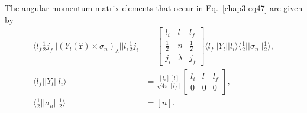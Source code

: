 The angular momentum matrix elements that occur in Eq.\ \eqref{chap3-eq47} are given by
\begin{align}
  \langle l_f \tfrac{1}{2} j_f || (Y_l ({\boldsymbol \hat{r}}) \times \sigma_n)_\lambda || l_i \tfrac{1}{2} j_i
  & = \begin{bmatrix} l_i & l & l_f\\ \tfrac{1}{2} & n & \tfrac{1}{2}\\ j_i & \lambda & j_f \end{bmatrix}
  \langle l_f || Y_l || l_i \rangle \langle\tfrac{1}{2} || \sigma_n || \tfrac{1}{2} \rangle, \label{chap3-eq48}\\
  \langle l_f || Y_l || l_i \rangle & = \frac{[l_i][l]}{\sqrt{4 \pi}[l_f]} \begin{bmatrix} l_i &l & l_f\\ 0 & 0 & 0 \end{bmatrix}, \label{chap3-eq49}\\
  \langle \tfrac{1}{2} || \sigma_n || \tfrac{1}{2} \rangle & = [n]. \label{chap3-eq50}
\end{align}

